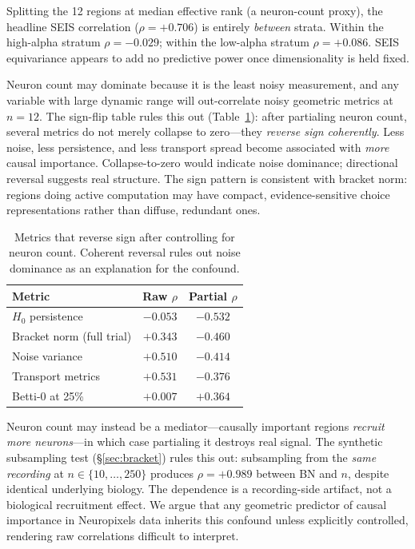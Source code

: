 \documentclass{article}
\begin{document}
Splitting the 12 regions at median effective rank (a neuron-count proxy), the headline SEIS correlation ($\rho = +0.706$) is entirely \emph{between} strata. Within the high-alpha stratum $\rho = -0.029$; within the low-alpha stratum $\rho = +0.086$. SEIS equivariance appears to add no predictive power once dimensionality is held fixed.

Neuron count may dominate because it is the least noisy measurement, and any variable with large dynamic range will out-correlate noisy geometric metrics at $n = 12$. The sign-flip table rules this out (Table~\ref{tab:signflip}): after partialing neuron count, several metrics do not merely collapse to zero---they \emph{reverse sign coherently}. Less noise, less persistence, and less transport spread become associated with \emph{more} causal importance. Collapse-to-zero would indicate noise dominance; directional reversal suggests real structure. The sign pattern is consistent with bracket norm: regions doing active computation may have compact, evidence-sensitive choice representations rather than diffuse, redundant ones.

\begin{table}[t]
\centering
\caption{Metrics that reverse sign after controlling for neuron count. Coherent reversal rules out noise dominance as an explanation for the confound.}
\label{tab:signflip}
\begin{tabular}{lcc}
\toprule
Metric & Raw $\rho$ & Partial $\rho$ \\
\midrule
$H_0$ persistence & $-0.053$ & $-0.532$ \\
Bracket norm (full trial) & $+0.343$ & $-0.460$ \\
Noise variance & $+0.510$ & $-0.414$ \\
Transport metrics & $+0.531$ & $-0.376$ \\
Betti-0 at 25\% & $+0.007$ & $+0.364$ \\
\bottomrule
\end{tabular}
\end{table}

Neuron count may instead be a mediator---causally important regions \emph{recruit more neurons}---in which case partialing it destroys real signal. The synthetic subsampling test (\S\ref{sec:bracket}) rules this out: subsampling from the \emph{same recording} at $n \in \{10, \ldots, 250\}$ produces $\rho = +0.989$ between BN and $n$, despite identical underlying biology. The dependence is a recording-side artifact, not a biological recruitment effect. We argue that any geometric predictor of causal importance in Neuropixels data inherits this confound unless explicitly controlled, rendering raw correlations difficult to interpret.
\end{document}
